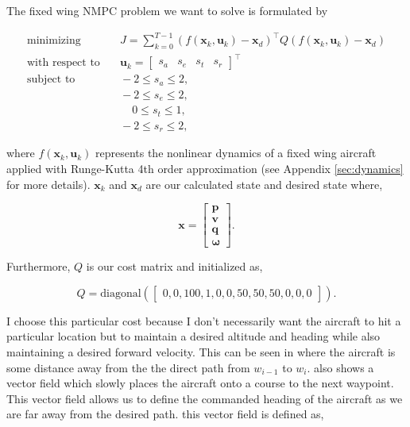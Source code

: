 \documentclass[letterpaper, 10 pt, conference]{ieeeconf}  %
\begin{document}
The fixed wing NMPC problem we want to solve is formulated by

\begin{equation}
\label{eq:objective}
\begin{aligned}
\text{minimizing} & \quad J= \sum_{k=0}^{T-1} (f(\mathbf{x}_k,\mathbf{u}_k)-\mathbf{x}_{d})^{\top} Q (f(\mathbf{x}_k,\mathbf{u}_k)-\mathbf{x}_{d}) \\
\text{with respect to} & \quad \mathbf{u}_k =\begin{bmatrix}s_{a} & s_{e} & s_{t} & s_{r}\end{bmatrix}^{\top} \\
\text{subject to} & \quad -2 \le s_{a} \le 2, \\
& \quad -2 \le s_{e} \le 2, \\
& \quad \hspace{13pt} 0 \le s_{t} \le 1, \\
& \quad -2 \le s_{r} \le 2,
\end{aligned}
\end{equation}

where $f(\mathbf{x}_k,\mathbf{u}_k)$ represents the nonlinear dynamics of a fixed wing aircraft applied with Runge-Kutta 4th order approximation (see Appendix \ref{sec:dynamics} for more details). $\mathbf{x}_k$ and $\mathbf{x}_{d}$ are our calculated state and desired state where,

\begin{equation}
\label{eq:lqr_current_desired_states}
\mathbf{x}=\begin{bmatrix}\mathbf{p} \\ \mathbf{v} \\ \mathbf{q} \\ \boldsymbol{\omega}\end{bmatrix}.
\end{equation}

Furthermore, $Q$ is our cost matrix and initialized as,

\begin{equation}
Q = \text{diagonal}(\begin{bmatrix}
0,0,100,1,0,0,50,50,50,0,0,0
\end{bmatrix}).
\end{equation}

I choose this particular cost because I don't necessarily want the aircraft to hit a particular location but to maintain a desired altitude and heading while also maintaining a desired forward velocity. This can be seen in  where the aircraft is some distance away from the the direct path from $w_{i-1}$ to $w_i$.  also shows a vector field which slowly places the aircraft onto a course to the next waypoint. This vector field allows us to define the commanded heading of the aircraft as we are far away from the desired path. this vector field is defined as,
\end{document}
